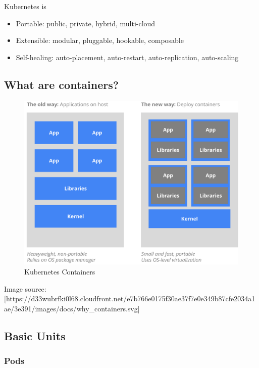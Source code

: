 Kubernetes is

\begin{itemize}

\item
  Portable: public, private, hybrid, multi-cloud
\item
  Extensible: modular, pluggable, hookable, composable
\item
  Self-healing: auto-placement, auto-restart, auto-replication,
  auto-scaling
\end{itemize}

\subsection{What are containers?}\label{what-are-containers}

\begin{figure}
\centering
\includegraphics{images/why_containers.svg}
\caption{Kubernetes Containers}
\end{figure}

Image source:
{[}https://d33wubrfki0l68.cloudfront.net/e7b766e0175f30ae37f7e0e349b87cfe2034a1ae/3e391/images/docs/why\_containers.svg{]}

\subsection{Basic Units}\label{basic-units}

\subsubsection{Pods}\label{pods}

